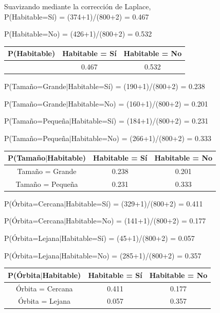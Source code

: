 \documentclass[11pt]{exam}
\begin{document}
\begin{questions}
Suavizando mediante la corrección de Laplace, \\

P(Habitable=Sí) = (374+1)/(800+2) = 0.467

P(Habitable=No) = (426+1)/(800+2) = 0.532

\begin{center}
	\begin{tabular}{ |c|c|c| } 
		\hline
		P(Habitable) & Habitable = Sí & Habitable = No \\
		\hline
		& 0.467 & 0.532 \\ 
		\hline
	\end{tabular}
\end{center}

P(Tamaño=Grande$|$Habitable=Sí) = (190+1)/(800+2) = 0.238

P(Tamaño=Grande$|$Habitable=No) = (160+1)/(800+2) = 0.201

P(Tamaño=Pequeña$|$Habitable=Sí) = (184+1)/(800+2) = 0.231

P(Tamaño=Pequeña$|$Habitable=No) = (266+1)/(800+2) = 0.333

\begin{center}
	\begin{tabular}{ |c|c|c| } 
		\hline
		P(Tamaño$|$Habitable) & Habitable = Sí & Habitable = No \\
		\hline
		Tamaño = Grande & 0.238 & 0.201 \\ 
		\hline
		Tamaño = Pequeña & 0.231 & 0.333 \\ 
		\hline
	\end{tabular}
\end{center}

P(Órbita=Cercana$|$Habitable=Sí) = (329+1)/(800+2) = 0.411

P(Órbita=Cercana$|$Habitable=No) = (141+1)/(800+2) = 0.177

P(Órbita=Lejana$|$Habitable=Sí) = (45+1)/(800+2) = 0.057

P(Órbita=Lejana$|$Habitable=No) = (285+1)/(800+2) = 0.357

\begin{center}
	\begin{tabular}{ |c|c|c| } 
		\hline
		P(Órbita$|$Habitable) & Habitable = Sí & Habitable = No \\
		\hline
		Órbita = Cercana & 0.411 & 0.177 \\ 
		\hline
		Órbita = Lejana & 0.057 & 0.357 \\ 
		\hline
	\end{tabular}
\end{center}


\end{questions}
\end{document}

